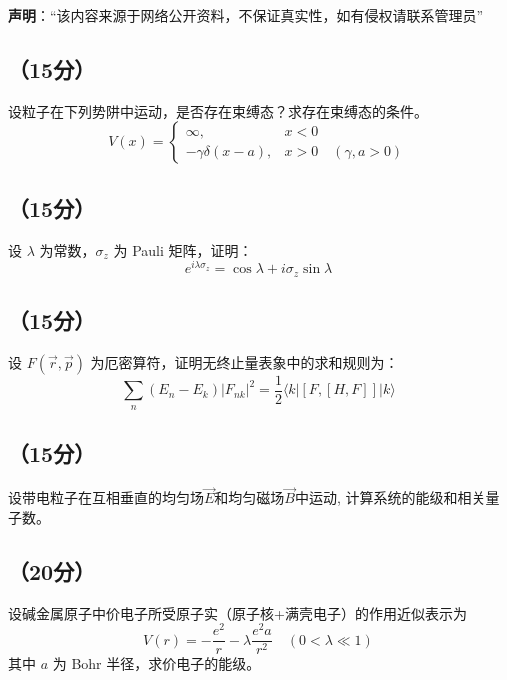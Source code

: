
\textbf{声明}：“该内容来源于网络公开资料，不保证真实性，如有侵权请联系管理员”

\subsection{（15分）}
设粒子在下列势阱中运动，是否存在束缚态？求存在束缚态的条件。
\[
V(x) =
\begin{cases}
\infty, & x < 0 \\
-\gamma \delta(x - a), & x > 0 \quad (\gamma, a > 0)
\end{cases}~
\]

\subsection{（15分）}
设 $\lambda$ 为常数，$\sigma_z$ 为 Pauli 矩阵，证明：
    \[
    e^{i \lambda \sigma_z} = \cos \lambda + i \sigma_z \sin \lambda~
    \]

\subsection{（15分）}
设 $F(\vec{r},\vec{p})$ 为厄密算符，证明无终止量表象中的求和规则为：
    \[
    \sum_n (E_n - E_k) |F_{nk}|^2 = \frac{1}{2} \langle k | [F, [H, F]] | k \rangle~
    \]

\subsection{（15分）}
设带电粒子在互相垂直的均匀场$\vec{E}$和均匀磁场$\vec{B}$中运动, 计算系统的能级和相关量子数。

\subsection{（20分）}
设碱金属原子中价电子所受原子实（原子核+满壳电子）的作用近似表示为
\[
V(r) = -\frac{e^2}{r} - \lambda \frac{e^2 a}{r^2} \quad (0 < \lambda \ll 1)~
\]
其中 $a$ 为 Bohr 半径，求价电子的能级。
